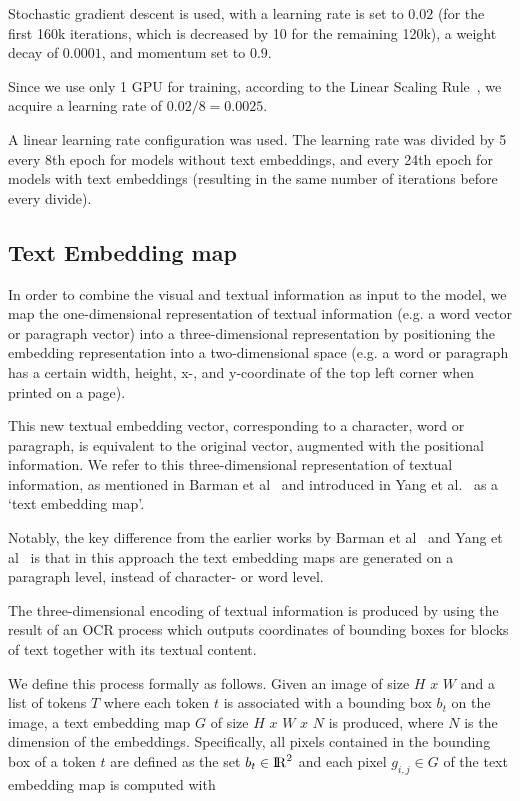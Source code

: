 \documentclass[oneside, english, bibtex]{kththesis}
\begin{document}
Stochastic gradient descent is used, with a learning rate is set to $0.02$ (for the first 160k iterations, which is decreased by 10 for the remaining 120k), a weight decay of $0.0001$, and momentum set to $0.9$.

Since we use only 1 GPU for training, according to the Linear Scaling Rule~\cite{DBLP:journals/corr/GoyalDGNWKTJH17}, we acquire a learning rate of $0.02/8=0.0025$.

A linear learning rate configuration was used. The learning rate was divided by 5 every 8th epoch for models without text embeddings, and every 24th epoch for models with text embeddings (resulting in the same number of iterations before every divide).

\subsection{Text Embedding map}

In order to combine the visual and textual information as input to the model, we map the one-dimensional representation of textual information (e.g. a word vector or paragraph vector) into a three-dimensional representation by positioning the embedding representation into a two-dimensional space (e.g. a word or paragraph has a certain width, height, x-, and y-coordinate of the top left corner when printed on a page).

This new textual embedding vector, corresponding to a character, word or paragraph, is equivalent to the original vector, augmented with the positional information. We refer to this three-dimensional representation of textual information, as mentioned in Barman et al~\cite{jdmdh:7097} and introduced in Yang et al.~\cite{DBLP:journals/corr/YangYAKKG17} as a ‘text embedding map’.

Notably, the key difference from the earlier works by Barman et al~\cite{jdmdh:7097} and Yang et al~\cite{DBLP:journals/corr/YangYAKKG17} is that in this approach the text embedding maps are generated on a paragraph level, instead of character- or word level.

The three-dimensional encoding of textual information is produced by using the result of an OCR process which outputs coordinates of bounding boxes for blocks of text together with its textual content.

We define this process formally as follows. Given an image of size $H$ $x$ $W$ and a list of tokens $T$ where each token $t$ is associated with a bounding box $b_t$ on the image, a text embedding map $G$ of size $H$ $x$ $W$ $x$ $N$ is produced, where $N$ is the dimension of the embeddings. Specifically, all pixels contained in the bounding box of a token $t$ are defined as the set $b_t \in {\rm I\!R}^2$ and each pixel $g_{i,j} \in G$ of the text embedding map is computed with
\end{document}
